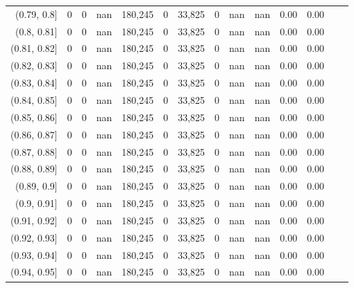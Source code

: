 \begin{tabular}{rrrrrrrrrrrrrr}
(0.79, 0.8]    &        0 &       0 &    nan &  180,245 &        0 &  33,825 &       0 &   nan &   nan &  0.00 &      0.00 \\
(0.8, 0.81]    &        0 &       0 &    nan &  180,245 &        0 &  33,825 &       0 &   nan &   nan &  0.00 &      0.00 \\
(0.81, 0.82]   &        0 &       0 &    nan &  180,245 &        0 &  33,825 &       0 &   nan &   nan &  0.00 &      0.00 \\
(0.82, 0.83]   &        0 &       0 &    nan &  180,245 &        0 &  33,825 &       0 &   nan &   nan &  0.00 &      0.00 \\
(0.83, 0.84]   &        0 &       0 &    nan &  180,245 &        0 &  33,825 &       0 &   nan &   nan &  0.00 &      0.00 \\
(0.84, 0.85]   &        0 &       0 &    nan &  180,245 &        0 &  33,825 &       0 &   nan &   nan &  0.00 &      0.00 \\
(0.85, 0.86]   &        0 &       0 &    nan &  180,245 &        0 &  33,825 &       0 &   nan &   nan &  0.00 &      0.00 \\
(0.86, 0.87]   &        0 &       0 &    nan &  180,245 &        0 &  33,825 &       0 &   nan &   nan &  0.00 &      0.00 \\
(0.87, 0.88]   &        0 &       0 &    nan &  180,245 &        0 &  33,825 &       0 &   nan &   nan &  0.00 &      0.00 \\
(0.88, 0.89]   &        0 &       0 &    nan &  180,245 &        0 &  33,825 &       0 &   nan &   nan &  0.00 &      0.00 \\
(0.89, 0.9]    &        0 &       0 &    nan &  180,245 &        0 &  33,825 &       0 &   nan &   nan &  0.00 &      0.00 \\
(0.9, 0.91]    &        0 &       0 &    nan &  180,245 &        0 &  33,825 &       0 &   nan &   nan &  0.00 &      0.00 \\
(0.91, 0.92]   &        0 &       0 &    nan &  180,245 &        0 &  33,825 &       0 &   nan &   nan &  0.00 &      0.00 \\
(0.92, 0.93]   &        0 &       0 &    nan &  180,245 &        0 &  33,825 &       0 &   nan &   nan &  0.00 &      0.00 \\
(0.93, 0.94]   &        0 &       0 &    nan &  180,245 &        0 &  33,825 &       0 &   nan &   nan &  0.00 &      0.00 \\
(0.94, 0.95]   &        0 &       0 &    nan &  180,245 &        0 &  33,825 &       0 &   nan &   nan &  0.00 &      0.00 \\

\end{tabular}
